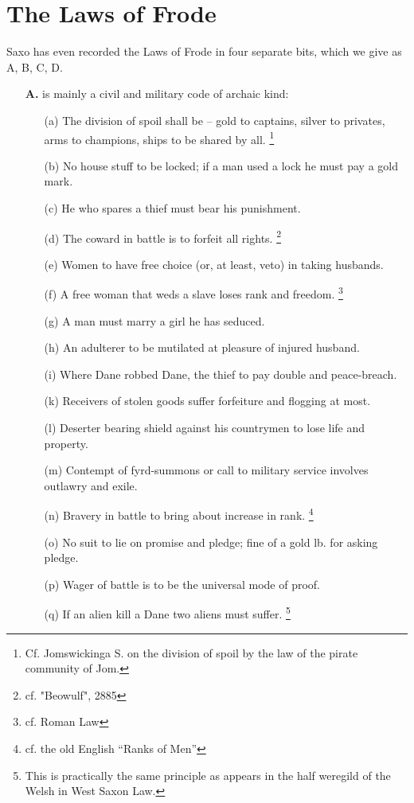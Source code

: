 \documentclass[10pt,a4paper]{report}
\begin{document}
\section{The Laws of Frode}
Saxo has even recorded the Laws of Frode in four separate bits, which we give as A, B, C, D.

\begin{itemize}
\item[\textbf{\large{A.}}] is mainly a civil and military code of archaic kind:
\begin{itemize}
\item[(a)] The division of spoil shall be -- gold to captains, silver to privates, arms to champions, ships to be shared by all. \footnote{Cf. Jomswickinga S. on the division of spoil by the law of the pirate community of Jom.}
\item[(b)] No house stuff to be locked; if a man used a lock he must pay a gold mark.
\item[(c)] He who spares a thief must bear his punishment.
\item[(d)] The coward in battle is to forfeit all rights. \footnote{cf. "Beowulf", 2885}
\item[(e)] Women to have free choice (or, at least, veto) in taking husbands.
\item[(f)] A free woman that weds a slave loses rank and freedom. \footnote{cf. Roman Law}
\item[(g)] A man must marry a girl he has seduced.
\item[(h)] An adulterer to be mutilated at pleasure of injured husband.
\item[(i)] Where Dane robbed Dane, the thief to pay double and peace-breach.
\item[(k)] Receivers of stolen goods suffer forfeiture and flogging at most.
\item[(l)] Deserter bearing shield against his countrymen to lose life and property.
\item[(m)] Contempt of fyrd-summons or call to military service involves outlawry and exile.
\item[(n)] Bravery in battle to bring about increase in rank. \footnote{cf. the old English ``Ranks of Men''}
\item[(o)] No suit to lie on promise and pledge; fine of a gold lb. for asking pledge.
\item[(p)] Wager of battle is to be the universal mode of proof.
\item[(q)] If an alien kill a Dane two aliens must suffer. \footnote{This is practically the same principle as appears in the half weregild of the Welsh in West Saxon Law.}
\end{itemize}


\end{itemize}
\end{document}
